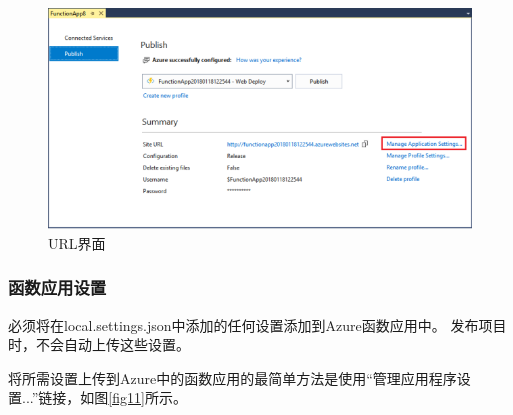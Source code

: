 \documentclass[11pt]{article}
\begin{document}
\begin{figure}[h]	
	\centering
	\includegraphics[scale=0.6]{figs/10.png}        %
	\caption{URL界面}
	\label{fig10}	
\end{figure}

\subsubsection{函数应用设置}
必须将在local.settings.json中添加的任何设置添加到Azure函数应用中。 发布项目时，不会自动上传这些设置。

将所需设置上传到Azure中的函数应用的最简单方法是使用“管理应用程序设置...”链接，如图\ref{fig11}所示。
\end{document}
